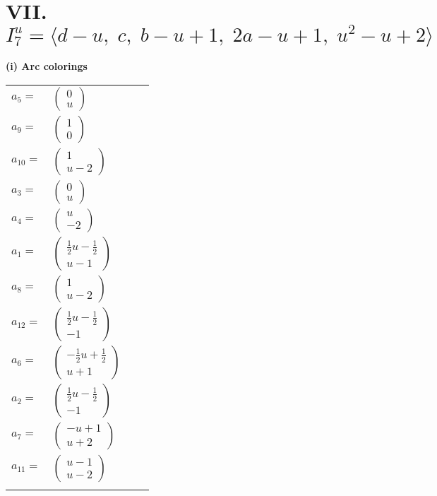 \documentclass[1p]{elsarticle_modified}
\theoremstyle{definition}
\begin{document}
\centering \section*{VII. $I^u_{7}= \langle d- u,\;c,\;b- u+1,\;2 a- u+1,\;u^2- u+2 \rangle$}
\flushleft \textbf{(i) Arc colorings}\\
\begin{tabular}{m{7pt} m{180pt} m{7pt} m{180pt} }
\flushright $a_{5}=$&$\begin{pmatrix}0\\u\end{pmatrix}$ \\
\flushright $a_{9}=$&$\begin{pmatrix}1\\0\end{pmatrix}$ \\
\flushright $a_{10}=$&$\begin{pmatrix}1\\u-2\end{pmatrix}$ \\
\flushright $a_{3}=$&$\begin{pmatrix}0\\u\end{pmatrix}$ \\
\flushright $a_{4}=$&$\begin{pmatrix}u\\-2\end{pmatrix}$ \\
\flushright $a_{1}=$&$\begin{pmatrix}\frac{1}{2} u-\frac{1}{2}\\u-1\end{pmatrix}$ \\
\flushright $a_{8}=$&$\begin{pmatrix}1\\u-2\end{pmatrix}$ \\
\flushright $a_{12}=$&$\begin{pmatrix}\frac{1}{2} u-\frac{1}{2}\\-1\end{pmatrix}$ \\
\flushright $a_{6}=$&$\begin{pmatrix}-\frac{1}{2} u+\frac{1}{2}\\u+1\end{pmatrix}$ \\
\flushright $a_{2}=$&$\begin{pmatrix}\frac{1}{2} u-\frac{1}{2}\\-1\end{pmatrix}$ \\
\flushright $a_{7}=$&$\begin{pmatrix}- u+1\\u+2\end{pmatrix}$ \\
\flushright $a_{11}=$&$\begin{pmatrix}u-1\\u-2\end{pmatrix}$\\&\end{tabular}
\end{document}
